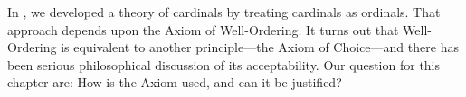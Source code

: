 \documentclass[../../../include/open-logic-section]{subfiles}
\begin{document}

In , we
developed a theory of cardinals by treating cardinals as ordinals.
That approach depends upon the Axiom of Well-Ordering. It turns out
that Well-Ordering is equivalent to another principle---the Axiom of
Choice---and there has been serious philosophical discussion of its
acceptability. Our question for this chapter are: How is the Axiom
used, and can it be justified?
\end{document}
